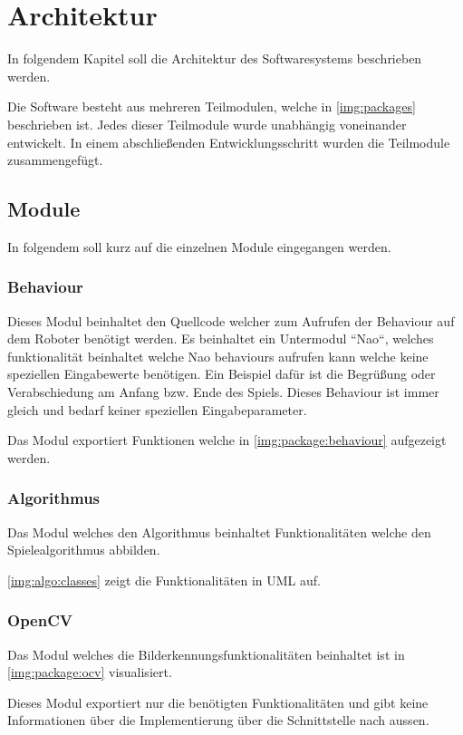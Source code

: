 \chapter{Architektur}

    In folgendem Kapitel soll die Architektur des Softwaresystems beschrieben
    werden.

    Die Software besteht aus mehreren Teilmodulen, welche in
    \autoref{img:packages} beschrieben ist.
    Jedes dieser Teilmodule wurde unabhängig voneinander entwickelt. In einem
    abschließenden Entwicklungsschritt wurden die Teilmodule zusammengefügt.

    \section{Module}

        In folgendem soll kurz auf die einzelnen Module eingegangen werden.

        \subsection{Behaviour}

            Dieses Modul beinhaltet den Quellcode welcher zum Aufrufen der
            Behaviour auf dem Roboter benötigt werden.
            Es beinhaltet ein Untermodul ``Nao``, welches funktionalität
            beinhaltet welche Nao behaviours aufrufen kann welche keine
            speziellen Eingabewerte benötigen.
            Ein Beispiel dafür ist die Begrüßung oder Verabschiedung am Anfang
            bzw. Ende des Spiels.
            Dieses Behaviour ist immer gleich und bedarf keiner speziellen
            Eingabeparameter.

            Das Modul exportiert Funktionen welche in
            \autoref{img:package:behaviour} aufgezeigt werden.

        \subsection{Algorithmus}

            Das Modul welches den Algorithmus beinhaltet Funktionalitäten welche
            den Spielealgorithmus abbilden.

            \autoref{img:algo:classes} zeigt die Funktionalitäten in UML auf.

        \subsection{OpenCV}

            Das Modul welches die Bilderkennungsfunktionalitäten beinhaltet ist
            in \autoref{img:package:ocv} visualisiert.

            Dieses Modul exportiert nur die benötigten Funktionalitäten und gibt
            keine Informationen über die Implementierung über die Schnittstelle
            nach aussen.

